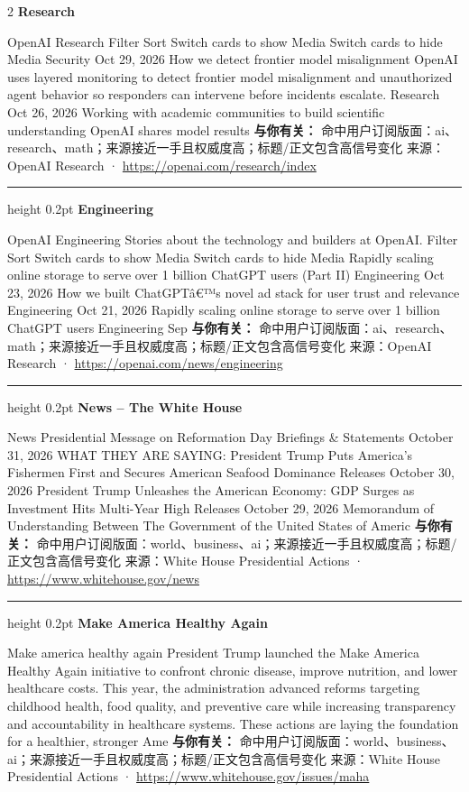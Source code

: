 \documentclass[10.5pt]{ctexart}
\begin{document}
\begin{multicols}{2}
{\large\bfseries Research}\par
OpenAI Research Filter Sort Switch cards to show Media Switch cards to hide Media Security Oct 29, 2026 How we detect frontier model misalignment OpenAI uses layered monitoring to detect frontier model misalignment and unauthorized agent behavior so responders can intervene before incidents escalate. Research Oct 26, 2026 Working with academic communities to build scientific understanding OpenAI shares model results 
\textbf{与你有关：} 命中用户订阅版面：ai、research、math；来源接近一手且权威度高；标题/正文包含高信号变化
{\footnotesize\color{ormuted} 来源：OpenAI Research · \url{https://openai.com/research/index}}
\vspace{2mm}
\hrule height 0.2pt
\vspace{2mm}
{\large\bfseries Engineering}\par
OpenAI Engineering Stories about the technology and builders at OpenAI. Filter Sort Switch cards to show Media Switch cards to hide Media Rapidly scaling online storage to serve over 1 billion ChatGPT users (Part II) Engineering Oct 23, 2026 How we built ChatGPTâ€™s novel ad stack for user trust and relevance Engineering Oct 21, 2026 Rapidly scaling online storage to serve over 1 billion ChatGPT users Engineering Sep
\textbf{与你有关：} 命中用户订阅版面：ai、research、math；来源接近一手且权威度高；标题/正文包含高信号变化
{\footnotesize\color{ormuted} 来源：OpenAI Research · \url{https://openai.com/news/engineering}}
\vspace{2mm}
\hrule height 0.2pt
\vspace{2mm}
{\large\bfseries News – The White House}\par
News Presidential Message on Reformation Day Briefings \& Statements October 31, 2026 WHAT THEY ARE SAYING: President Trump Puts America’s Fishermen First and Secures American Seafood Dominance Releases October 30, 2026 President Trump Unleashes the American Economy: GDP Surges as Investment Hits Multi-Year High Releases October 29, 2026 Memorandum of Understanding Between The Government of the United States of Americ
\textbf{与你有关：} 命中用户订阅版面：world、business、ai；来源接近一手且权威度高；标题/正文包含高信号变化
{\footnotesize\color{ormuted} 来源：White House Presidential Actions · \url{https://www.whitehouse.gov/news}}
\vspace{2mm}
\hrule height 0.2pt
\vspace{2mm}
{\large\bfseries Make America Healthy Again}\par
Make america healthy again President Trump launched the Make America Healthy Again initiative to confront chronic disease, improve nutrition, and lower healthcare costs. This year, the administration advanced reforms targeting childhood health, food quality, and preventive care while increasing transparency and accountability in healthcare systems. These actions are laying the foundation for a healthier, stronger Ame
\textbf{与你有关：} 命中用户订阅版面：world、business、ai；来源接近一手且权威度高；标题/正文包含高信号变化
{\footnotesize\color{ormuted} 来源：White House Presidential Actions · \url{https://www.whitehouse.gov/issues/maha}}
\end{multicols}
\end{document}

